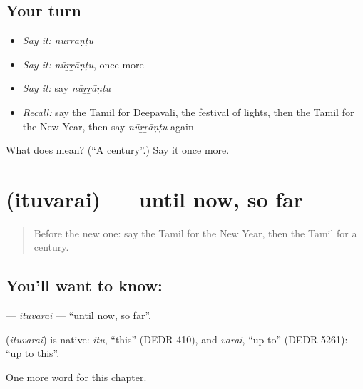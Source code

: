 \subsection*{Your turn}
\begin{itemize}
\raggedright
  \item \emph{Say it:} \emph{nūṟṟāṇṭu}
  \item \emph{Say it:} \emph{nūṟṟāṇṭu}, once more
  \item \emph{Say it:} say \emph{nūṟṟāṇṭu}
  \item \emph{Recall:} say the Tamil for Deepavali, the festival of lights, then the Tamil for the New Year, then say \emph{nūṟṟāṇṭu} again
\end{itemize}

\begin{tcolorbox}[breakable,colback=teal!4,colframe=teal!35!black,title={Before you move on}]
What does  mean? (\textquotedblleft{}A century\textquotedblright{}.) Say it once more.
\end{tcolorbox}
\section[\texorpdfstring{\ta{இதுவரை} (ituvarai)}{இதுவரை (ituvarai)}]{ (ituvarai) — until now, so far}

\label{lesson:TA-C203-ituvarai}



\begin{quote}
Before the new one: say the Tamil for the New Year, then the Tamil for a century.
\end{quote}

\subsection*{You'll want to know: }
\textbf{} — \emph{ituvarai} — \textquotedblleft{}until now, so far\textquotedblright{}.

\begin{cousinweb}
\textbf{} (\emph{ituvarai}) is native: \emph{itu}, \textquotedblleft{}this\textquotedblright{} (DEDR 410), and \emph{varai}, \textquotedblleft{}up to\textquotedblright{} (DEDR 5261): \textquotedblleft{}up to this\textquotedblright{}.
\end{cousinweb}

\begin{grammarlens}[title={What you've built}]
One more word for this chapter.
\end{grammarlens}

